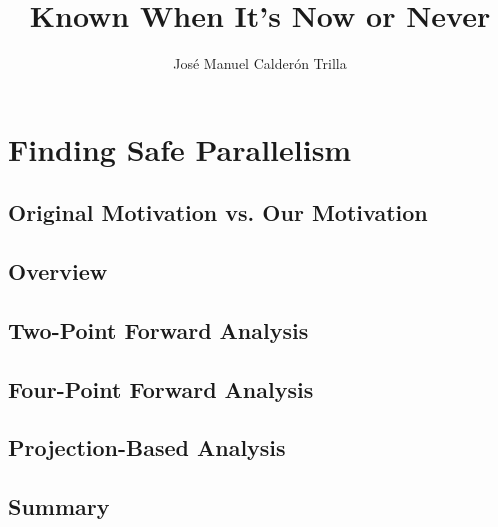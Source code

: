 \documentclass{jfp1}
\title{Known When It's Now or Never}
\author{Jos\'{e} Manuel Calder\'{o}n Trilla}
\begin{document}
\chapter{Finding Safe Parallelism}
\label{chap:discovery} 


    \section{Original Motivation vs. Our Motivation}
    

    \section{Overview}
    \label{sec:strictnessOverview}
    

    \section{Two-Point Forward Analysis}
    \label{sec:twoPoint}
    

    \section{Four-Point Forward Analysis}
    \label{sec:fourPoint}
    

    \section{Projection-Based Analysis}
    \label{sec:projections}
    

    \section{Summary}
    \label{sec:summ2}
    

%
%
%
%    
%
%    
%
%
%    
    



\end{document}
